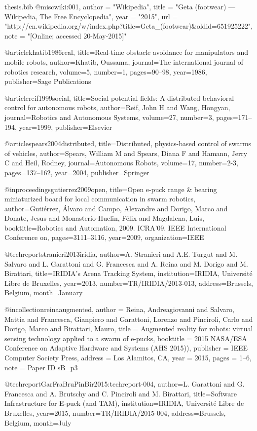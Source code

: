 \documentclass[oneside, a4paper, 12pt]{memoir}
\begin{document}
\begin{filecontents}{thesis.bib}
@misc{wiki:001,
   author = "Wikipedia",
   title = "Geta (footwear) --- Wikipedia{,} The Free Encyclopedia",
   year = "2015",
   url = "http://en.wikipedia.org/w/index.php?title=Geta_(footwear)&oldid=651925222",
   note = "[Online; accessed 20-May-2015]"
 }
 
 @article{khatib1986real,
  title={Real-time obstacle avoidance for manipulators and mobile robots},
  author={Khatib, Oussama},
  journal={The international journal of robotics research},
  volume={5},
  number={1},
  pages={90--98},
  year={1986},
  publisher={Sage Publications}
}

@article{reif1999social,
  title={Social potential fields: A distributed behavioral control for autonomous robots},
  author={Reif, John H and Wang, Hongyan},
  journal={Robotics and Autonomous Systems},
  volume={27},
  number={3},
  pages={171--194},
  year={1999},
  publisher={Elsevier}
}

@article{spears2004distributed,
  title={Distributed, physics-based control of swarms of vehicles},
  author={Spears, William M and Spears, Diana F and Hamann, Jerry C and Heil, Rodney},
  journal={Autonomous Robots},
  volume={17},
  number={2-3},
  pages={137--162},
  year={2004},
  publisher={Springer}
}

@inproceedings{gutierrez2009open,
  title={Open e-puck range \& bearing miniaturized board for local communication in swarm robotics},
  author={Guti{\'e}rrez, {\'A}lvaro and Campo, Alexandre and Dorigo, Marco and Donate, Jesus and Monasterio-Huelin, F{\'e}lix and Magdalena, Luis},
  booktitle={Robotics and Automation, 2009. ICRA'09. IEEE International Conference on},
  pages={3111--3116},
  year={2009},
  organization={IEEE}
}

@techreport{stranieri2013iridia,
  author={A. Stranieri and A.E. Turgut and M. Salvaro and L. Garattoni and G. Francesca and A. Reina and M. Dorigo and  M. Birattari},
  title={IRIDIA's Arena Tracking System},
  institution={IRIDIA, Universit{\'e} Libre de Bruxelles},
  year={2013},
  number={TR/IRIDIA/2013-013},
  address={Brussels, Belgium},
  month={January}
}

@incollection{reinaaugmented,
  author = {Reina, Andreagiovanni and Salvaro, Mattia and Francesca, Gianpiero and Garattoni, Lorenzo and Pinciroli, Carlo and Dorigo, Marco and Birattari, Mauro},
  title = {Augmented reality for robots: virtual sensing technology applied to a swarm of e-pucks},
  booktitle = {2015 {NASA/ESA} Conference on Adaptive Hardware and Systems ({AHS 2015}))},
  publisher = {{IEEE} Computer Society Press},
  address = {Los Alamitos, CA},
  year = {2015},
  pages = {1--6},
  note = {Paper ID sB\_p3}
}

@techreport{GarFraBruPinBir2015:techreport-004,
 author={L. Garattoni and G. Francesca and A. Brutschy and C. Pinciroli and M. Birattari},
 title={Software Infrastructure for E-puck (and TAM)},
 institution={IRIDIA, Universit{\'e} Libre de Bruxelles},
 year={2015},
 number={TR/IRIDIA/2015-004},
 address={Brussels, Belgium},
 month={July}
}

\end{filecontents}



\end{document}
